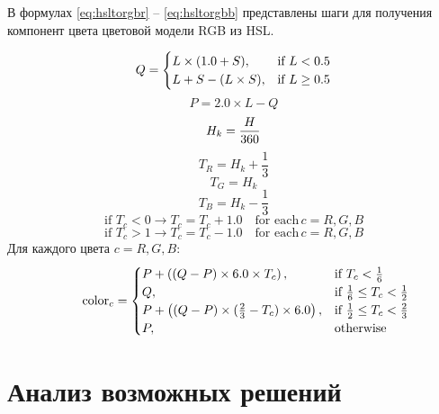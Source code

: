 В формулах \ref{eq:hsltorgbr} -- \ref{eq:hsltorgbb} представлены шаги для получения компонент цвета цветовой модели RGB из HSL.

\begin{equation}
	{\label{eq:hsltorgbr}\displaystyle Q={\begin{cases}L\times (1.0+S),&{\mbox{if }}L<0.5\\L+S-(L\times S),&{\mbox{if }}L\geq 0.5\end{cases}}}
\end{equation}
\begin{equation}
	{\displaystyle P=2.0\times L-Q}
\end{equation}
\begin{equation}
	{\displaystyle H_{k}={H \over 360}}
\end{equation}
\begin{equation}
	{\displaystyle T_{R}=H_{k}+{\frac {1}{3}}}
\end{equation}
\begin{equation}
	{\displaystyle T_{G}=H_{k}}
\end{equation}
\begin{equation}
	{\displaystyle T_{B}=H_{k}-{\frac {1}{3}}}
\end{equation}
\begin{equation}
	{\displaystyle {\mbox{if }}T_{c}<0\rightarrow T_{c}=T_{c}+1.0\quad {\mbox{for each}}\,c=R,G,B}
\end{equation}
\begin{equation}
	{\displaystyle {\mbox{if }}T_{c}>1\rightarrow T_{c}=T_{c}-1.0\quad {\mbox{for each}}\,c=R,G,B}
\end{equation}
Для каждого цвета $c = R,G,B$:
\begin{equation}
	{\label{eq:hsltorgbb}\displaystyle \qquad \mathrm {color} _{c}={\begin{cases}P+\left((Q-P)\times 6.0\times T_{c}\right),&{\mbox{if }}T_{c}<{\frac {1}{6}}\\Q,&{\mbox{if }}{\frac {1}{6}}\leq T_{c}<{\frac {1}{2}}\\P+\left((Q-P)\times ({\frac {2}{3}}-T_{c})\times 6.0\right),&{\mbox{if }}{\frac {1}{2}}\leq T_{c}<{\frac {2}{3}}\\P,&{\mbox{otherwise }}\end{cases}}}
\end{equation}

\section{Анализ возможных решений}

